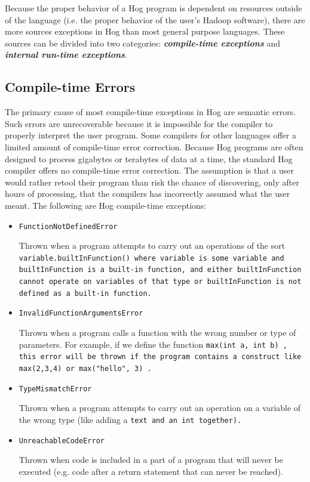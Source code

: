 \documentclass{book}
\begin{document}
Because the proper behavior of a Hog program is dependent on resources outside of
the language (i.e. the proper behavior of the user’s Hadoop software), there are
more sources exceptions in Hog than most general purpose languages. These sources
can be divided into two categories: \textbf{\emph{compile­-time exceptions}} and
\textbf{\emph{internal run­-time exceptions}}.

\subsection{Compile-time Errors} %
\label{sub:compile_time_exceptions}

The primary cause of most compile-­time exceptions in Hog are semantic errors. Such
errors are unrecoverable because it is impossible for the compiler to properly
interpret the user program. Some compilers for other languages offer a limited
amount of compile-­time error correction. Because Hog programs are often designed
to process gigabytes or terabytes of data at a time, the standard Hog compiler
offers no compile-­time error correction. The assumption is that a user would
rather re­tool their program than risk the chance of discovering, only after hours
of processing, that the compilers has incorrectly assumed what the user meant. The
following are Hog compile-­time exceptions:

\begin{itemize}
  
  \item[] \tt FunctionNotDefinedError \rm
  
   Thrown when a program attempts to carry out an operations of the sort \tt
variable.builtInFunction() \rm where \tt variable \rm is some variable and \tt
builtInFunction \rm is a built-in function, and either \tt builtInFunction \rm
cannot operate on variables of that type or \tt builtInFunction \rm  is not
defined as a built-in function.
  
  \item[] \tt InvalidFunctionArgumentsError \rm
   
    Thrown when a program calls a function with the wrong number or type of
parameters. For example, if we define the function \tt max(int a, int b) \rm,
this error will be thrown if the program contains a construct like \tt
max(2,3,4) \rm or \tt max("hello", 3) \rm.

   \item[] \tt TypeMismatchError \rm  

   Thrown when a program attempts to carry out an operation on a variable of
the wrong type (like adding a \tt text \rm and an \tt int \rm together).
  
   \item[] \tt UnreachableCodeError \rm

   Thrown when code is included in a part of a program that will never be
executed (e.g. code after a return statement that can never be reached).

\end{itemize}
\end{document}

